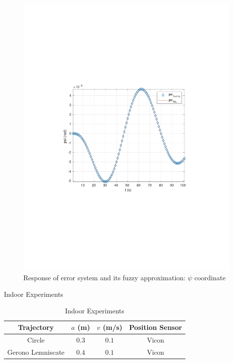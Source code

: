 \begin{frame}
		\begin{figure}[!htb]
			\centering
			\includegraphics[scale=.7,trim={3.5cm 8cm 4cm 8cm},clip]{figuras/OL/psi.pdf}
			\caption{Response of error system and its fuzzy approximation: $\psi$ coordinate}
			\label{fig:OL_psi}
		\end{figure}
\end{frame}


\begin{frame}{Indoor Experiments}
 \begin{table}[!htb]
 	\centering
 	\caption{Indoor Experiments}
 	\begin{tabular}{||c c c c||} 
 		\hline
 		Trajectory & $a$ (m) & $v$ (m/s) & Position Sensor  \\ %
 		\hline\hline
 		Circle & $0.3$ & $0.1$ & Vicon \\
 		Gerono Lemniscate & $0.4$ & $0.1$ & Vicon \\
 		\hline
 	\end{tabular}
 	\label{table:indoor}
 \end{table}
\end{frame}

